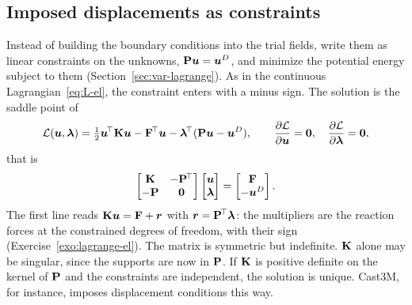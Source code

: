 \subsection{Imposed displacements as constraints}\label{ssec:ritz-lagrange}
%
Instead of building the boundary conditions into the trial fields, write
them as linear constraints on the unknowns, $\mathbf{P}\bm{u}=\bm{u}^{D}$, and minimize
the potential energy subject to them (Section~\ref{sec:var-lagrange}). As in
the continuous Lagrangian~\eqref{eq:L-el}, the constraint enters with a minus
sign. The solution is the saddle point of
\[
  \mathcal L(\bm{u},\bm{\lambda})=\tfrac12\bm{u}^{\!\top}\mathbf{K}\bm{u}-\mathbf{F}^{\!\top}\bm{u}-\bm{\lambda}^{\!\top}(\mathbf{P}\bm{u}-\bm{u}^{D}),
  \qquad
  \frac{\partial\mathcal L}{\partial\bm{u}}=\bm{0},\quad
  \frac{\partial\mathcal L}{\partial\bm{\lambda}}=\bm{0},
\]
that is
\begin{equation}\label{eq:saddle}
  \begin{bmatrix}\mathbf{K}&-\mathbf{P}^{\!\top}\\ -\mathbf{P}&\mathbf{0}\end{bmatrix}
  \begin{bmatrix}\bm{u}\\ \bm{\lambda}\end{bmatrix}=
  \begin{bmatrix}\mathbf{F}\\ -\bm{u}^{D}\end{bmatrix}.
\end{equation}
The first line reads $\mathbf{K}\bm{u}=\mathbf{F}+\bm{r}$ with $\bm{r}=\mathbf{P}^{\!\top}\bm{\lambda}$:
the multipliers are the reaction forces at the constrained degrees of freedom,
with their sign (Exercise~\ref{exo:lagrange-el}). The matrix is symmetric but
indefinite. $\mathbf{K}$ alone may be singular, since the supports are now in
$\mathbf{P}$. If $\mathbf{K}$ is positive definite on the kernel of $\mathbf{P}$ and
the constraints are independent, the solution is unique. Cast3M, for instance, imposes
displacement conditions this way.

